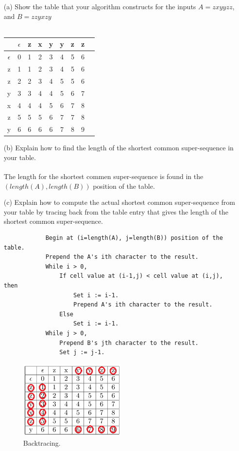 \documentclass[10pt]{article}
\begin{document}
		\begin{enumerate}
			\item[(a)] Show the table that your algorithm constructs for the inputs $A = zxyyzz$, and $B = zzyxzy$
			\\
			\\
			\begin{tabular}{| c | c | c | c | c | c | c | c | c |}
				\hline
				 & $\epsilon$ & z & x & y & y & z & z\\ \hline
				 $\epsilon$ & 0 & 1 & 2 & 3 & 4 & 5 & 6\\ \hline 
				z & 1 & 1 & 2 & 3 & 4 & 5 & 6\\ \hline
				z & 2 & 2 & 3 & 4 & 5 & 5 & 6\\ \hline
				y & 3 & 3 & 4 & 4 & 5 & 6 & 7\\ \hline
				x & 4 & 4 & 4 & 5 & 6 & 7 & 8\\ \hline
				z & 5 & 5 & 5 & 6 & 7 & 7 & 8\\ \hline
				y & 6 & 6 & 6 & 6 & 7 & 8 & 9\\ \hline 
			\end{tabular}
			\item[(b)] Explain how to find the length of the shortest common super-sequence in your table.\\
			\\ 
			The length for the shortest commen super-sequence is found in the $(length(A), length(B))$ position of the table.
			\item[(c)] Explain how to compute the actual shortest common super-sequence from your table by tracing
								 back from the table entry that gives the length of the shortest common super-sequence.\\
			\begin{verbatim}
			Begin at (i=length(A), j=length(B)) position of the table.
			Prepend the A's ith character to the result.
			While i > 0,
			    If cell value at (i-1,j) < cell value at (i,j), then
			        Set i := i-1.
			        Prepend A's ith character to the result.
			    Else
			        Set i := i-1.
			While j > 0,
			    Prepend B's jth character to the result.
			    Set j := j-1.
			\end{verbatim}
													\begin{figure}[h]
											\centering
												\includegraphics[width=200px]{dynamic4c.png}
											  \caption{Backtracing.}
										\end{figure}
		\end{enumerate}
\end{document}
